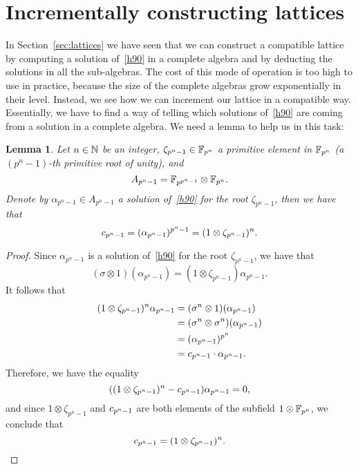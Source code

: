 \documentclass{sig-alternate}
\newtheorem{lemma}{Lemma}
\begin{document}
\section{Incrementally constructing lattices}
\label{sec:construction}
In Section~\ref{sec:lattices} we have seen that we can construct a compatible
lattice by computing a solution of~\eqref{h90} in a complete algebra and
by deducting the solutions in all the sub-algebras. The cost of this mode of
operation is too high to use in practice, because the size of the complete
algebras grow exponentially in their level. Instead, we see how we can
increment our lattice in a compatible way.
Essentially, we have to find a way of telling which solutions of~\eqref{h90} are
coming from a solution in a complete algebra. We need a lemma to help us in this task:
\begin{lemma}
  \label{lemma:formula}
  Let $n\in\mathbb{N}$ be an integer, $\zeta_{p^n-1}\in\mathbb{F}_{p^n}$ a
  primitive element in $\mathbb{F}_{p^n}$ (a $(p^n-1)$-th primitive root of
  unity), and
  \[
    A_{p^n-1} = \mathbb{F}_{p^{p^n-1}}\otimes\mathbb{F}_{p^n}.
  \]
  Denote by $\alpha_{p^n-1}\in A_{p^{n}-1}$ a solution of~\eqref{h90} for the
  root $\zeta_{p^n-1}$, then we have that
  \[
    c_{p^n-1} = (\alpha_{p^n-1})^{p^n-1} = (1\otimes\zeta_{p^n-1})^n.
  \]
\end{lemma}
\begin{proof}
  Since $\alpha_{p^n-1}$ is a solution of~\eqref{h90} for the root
  $\zeta_{p^n-1}$, we have that
  \[
    (\sigma\otimes 1)(\alpha_{p^n-1}) =
    (1\otimes\zeta_{p^n-1})\alpha_{p^n-1}.
  \]
  It follows that
  \begin{align*}
    (1\otimes\zeta_{p^n-1})^n \alpha_{p^n-1} &= (\sigma^n\otimes1)(\alpha_{p^n-1})\\
    &= (\sigma^n\otimes\sigma^n)(\alpha_{p^n-1})\\
    &= (\alpha_{p^n-1})^{p^n}\\
    &= c_{p^n-1}\cdot\alpha_{p^n-1}.
  \end{align*}
  Therefore, we have the equality
  \[
    ( (1\otimes\zeta_{p^n-1})^n - c_{p^n-1})\alpha_{p^n-1} = 0,
  \]
  and since $1\otimes\zeta_{p^n-1}$ and $c_{p^n-1}$ are both elements of the
  subfield $1\otimes\mathbb{F}_{p^n}$, we conclude that
  \[
    c_{p^n-1} = (1\otimes\zeta_{p^n-1})^n.
  \]
\end{proof}
\end{document}

